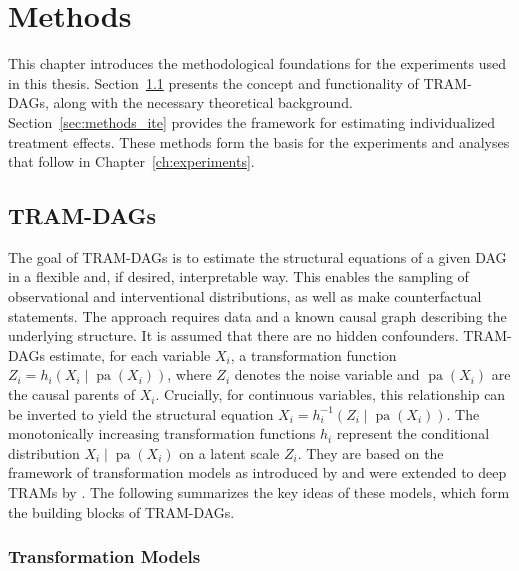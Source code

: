 




\chapter{Methods}

This chapter introduces the methodological foundations for the experiments used in this thesis. Section~\ref{sec:methods_tram_dags} presents the concept and functionality of TRAM-DAGs, along with the necessary theoretical background. Section~\ref{sec:methods_ite} provides the framework for estimating individualized treatment effects.  These methods form the basis for the experiments and analyses that follow in Chapter~\ref{ch:experiments}.



\section{TRAM-DAGs} \label{sec:methods_tram_dags}

The goal of TRAM-DAGs is to estimate the structural equations of a given DAG in a flexible and, if desired, interpretable way. This enables the sampling of observational and interventional distributions, as well as make counterfactual statements. The approach requires data and a known causal graph describing the underlying structure. It is assumed that there are no hidden confounders. TRAM-DAGs estimate, for each variable $X_i$, a transformation function $Z_i = h_i(X_i \mid \operatorname{pa}(X_i))$, where $Z_i$ denotes the noise variable and $\operatorname{pa}(X_i)$ are the causal parents of $X_i$. Crucially, for continuous variables, this relationship can be inverted to yield the structural equation $X_i = h_i^{-1}(Z_i \mid \operatorname{pa}(X_i))$. The monotonically increasing transformation functions $h_i$ represent the conditional distribution  $X_i \mid \operatorname{pa}(X_i)$ on a latent scale $Z_i$. They are based on the framework of transformation models as introduced by \citet{hothorn2014} and were extended to deep TRAMs by \citet{sick2020}. The following summarizes the key ideas of these models, which form the building blocks of TRAM-DAGs.


\subsection{Transformation Models} \label{sec:trams}


